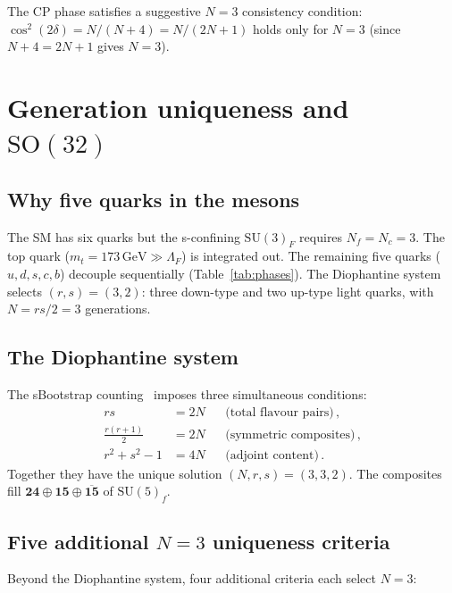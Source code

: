 \documentclass[12pt,a4paper]{article}
\newcommand{\SU}{\mathrm{SU}}
\newcommand{\SO}{\mathrm{SO}}
\newcommand{\Nf}{N_{\!f}}
\newcommand{\Nc}{N_{\!c}}
\newcommand{\GeV}{\,\mathrm{GeV}}
\begin{document}
The CP phase satisfies a suggestive $N = 3$ consistency condition:
$\cos^2(2\delta) = N/(N+4) = N/(2N+1)$ holds only for $N = 3$
(since $N + 4 = 2N + 1$ gives $N = 3$).


\section{Generation uniqueness and $\SO(32)$}
\label{sec:SO32}

\subsection{Why five quarks in the mesons}

The SM has six quarks but the s-confining $\SU(3)_F$ requires
$\Nf = \Nc = 3$.
The top quark ($m_t = 173\GeV \gg \Lambda_F$) is integrated out.
The remaining five quarks ($u,d,s,c,b$) decouple sequentially
(Table~\ref{tab:phases}).
The Diophantine system selects $(r, s) = (3, 2)$: three down-type
and two up-type light quarks, with $N = rs/2 = 3$ generations.

\subsection{The Diophantine system}

The sBootstrap counting~\cite{Rivero:2024epjc} imposes three
simultaneous conditions:
\begin{align}
  rs &= 2N && \text{(total flavour pairs)}\,,\nonumber\\
  \frac{r(r+1)}{2} &= 2N && \text{(symmetric composites)}\,,
  \nonumber\\
  r^2 + s^2 - 1 &= 4N && \text{(adjoint content)}\,.
\end{align}
Together they have the unique solution $(N, r, s) = (3, 3, 2)$.
The composites fill $\mathbf{24} \oplus \mathbf{15} \oplus
\overline{\mathbf{15}}$ of $\SU(5)_f$.

\subsection{Five additional $N = 3$ uniqueness criteria}

Beyond the Diophantine system, four additional criteria each
select $N = 3$:
\end{document}

